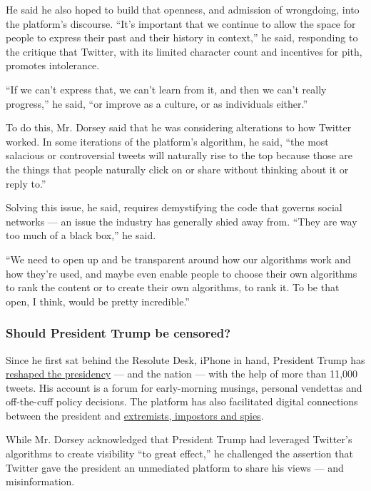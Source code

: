 He said he also hoped to build that openness, and admission of
wrongdoing, into the platform's discourse. ``It's important that we
continue to allow the space for people to express their past and their
history in context,'' he said, responding to the critique that Twitter,
with its limited character count and incentives for pith, promotes
intolerance.

``If we can't express that, we can't learn from it, and then we can't
really progress,'' he said, ``or improve as a culture, or as individuals
either.''

To do this, Mr. Dorsey said that he was considering alterations to how
Twitter worked. In some iterations of the platform's algorithm, he said,
``the most salacious or controversial tweets will naturally rise to the
top because those are the things that people naturally click on or share
without thinking about it or reply to.''

Solving this issue, he said, requires demystifying the code that governs
social networks --- an issue the industry has generally shied away from.
``They are way too much of a black box,'' he said.

``We need to open up and be transparent around how our algorithms work
and how they're used, and maybe even enable people to choose their own
algorithms to rank the content or to create their own algorithms, to
rank it. To be that open, I think, would be pretty incredible.''

\hypertarget{should-president-trump-be-censored}{%
\subsubsection{Should President Trump be
censored?}\label{should-president-trump-be-censored}}

Since he first sat behind the Resolute Desk, iPhone in hand, President
Trump has
\href{https://www.nytimes.com/interactive/2019/11/02/us/politics/trump-twitter-presidency.html}{reshaped
the presidency} --- and the nation --- with the help of more than 11,000
tweets. His account is a forum for early-morning musings, personal
vendettas and off-the-cuff policy decisions. The platform has also
facilitated digital connections between the president and
\href{https://www.nytimes.com/interactive/2019/11/02/us/politics/trump-twitter-disinformation.html}{extremists,
impostors and spies}.

While Mr. Dorsey acknowledged that President Trump had leveraged
Twitter's algorithms to create visibility ``to great effect,'' he
challenged the assertion that Twitter gave the president an unmediated
platform to share his views --- and misinformation.

